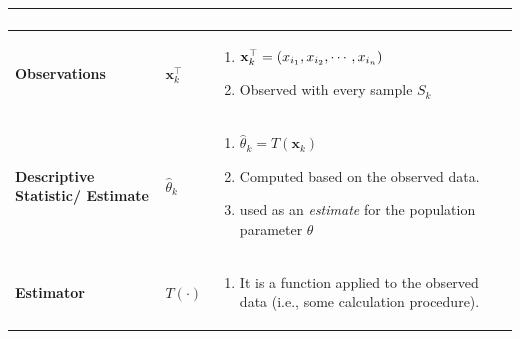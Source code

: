 \begin{customArrayStretch}{1.3}
\begin{longtable}{>{\RaggedRight\arraybackslash}p{4cm} >{\centering\arraybackslash}p{0.5cm} p{10.5cm}}
\begin{minipage}{10.3cm}
\begin{enumerate}
        \end{enumerate}
        \vspace{0.15cm}
    \end{minipage}
    \\ \hline


\textbf{Observations} &
    $\mathbf{x}_k^\top$ &
    \begin{minipage}{10.3cm}
        \vspace{0.15cm}
        \begin{enumerate}
            \item $\mathbf{x}_k^\top = \left(x_{i_1}, x_{i_2}, \cdots, x_{i_n}\right)$
            \hfill \cite{statistics/book/Statistics-for-Data-Scientists/Maurits-Kaptein}

            \item Observed with every sample $S_k$
            \hfill \cite{statistics/book/Statistics-for-Data-Scientists/Maurits-Kaptein}
        \end{enumerate}
        \vspace{0.15cm}
    \end{minipage}
    \\ \hline

\textbf{Descriptive Statistic/ Estimate} &
    $\hat{\theta}_k$ &
    \begin{minipage}{10.3cm}
        \vspace{0.15cm}
        \begin{enumerate}
            \item $\hat{\theta}_k = T(\mathbf{x}_k)$
            \hfill \cite{statistics/book/Statistics-for-Data-Scientists/Maurits-Kaptein}

            \item Computed based on the observed data.
            \hfill \cite{statistics/book/Statistics-for-Data-Scientists/Maurits-Kaptein}

            \item used as an \textit{estimate} for the population parameter $\theta$
            \hfill \cite{statistics/book/Statistics-for-Data-Scientists/Maurits-Kaptein}

        \end{enumerate}
        \vspace{0.15cm}
    \end{minipage}
    \\ \hline

\textbf{Estimator} &
    $T(\cdot)$ &
    \begin{minipage}{10.3cm}
        \vspace{0.15cm}
        \begin{enumerate}
            \item It is a function applied to the observed data (i.e., some calculation procedure).
            \hfill \cite{statistics/book/Statistics-for-Data-Scientists/Maurits-Kaptein}


\end{enumerate}
\end{minipage}
\end{longtable}
\end{customArrayStretch}
